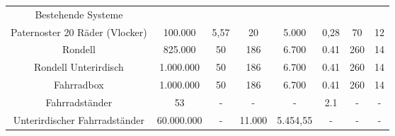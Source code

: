 \begin{longtable}{|c|c|c|c|c|c|c|c|}
  Bestehende Systeme                                                                                                                                                                                                                                                                                                                 \\
  Paternoster 20 Räder (Vlocker) & 100.000                             & 5,57\cite{vlocker_fläche,parkplatz_größe} & 20\cite{vlocker_kapazität}        & 5.000\cite{vlocker_preis}                   & 0,28                                      & 70\cite{vlocker_durchsatz}          & 12                                          \\
  Rondell                        & 825.000\cite{rondell_preis}         & 50\cite{rondell_fläche}                   & 186\cite{rondell_kapazität}       & 6.700                                       & 0.41                                      & 260\cite{rondell_durchsatz}         & 14                                          \\
  Rondell Unterirdisch           & 1.000.000\cite{rondell_unter_preis} & 50\cite{rondell_unter_fläche}             & 186\cite{rondell_unter_kapazität} & 6.700                                       & 0.41                                      & 260\cite{rondell_unter_durchsatz}   & 14                                          \\
  Fahrradbox                     & 1.000.000\cite{box_preis}           & 50\cite{box_fläche}                       & 186\cite{box_kapazität}           & 6.700                                       & 0.41                                      & 260\cite{box_durchsatz}             & 14                                          \\
  Fahrradständer                 & 53\cite{ständer_preis}              & -                                         & -                                 & -                                           & 2.1\cite{leitfaden_vorarlberg}            & -                                   & -                                           \\
  Unterirdischer Fahrradständer  & 60.000.000\cite{ständer_unter}      & -                                         & 11.000\cite{ständer_unter}        & 5.454,55                                    & -                                         & -                                   & -                                           \\


\end{longtable}
